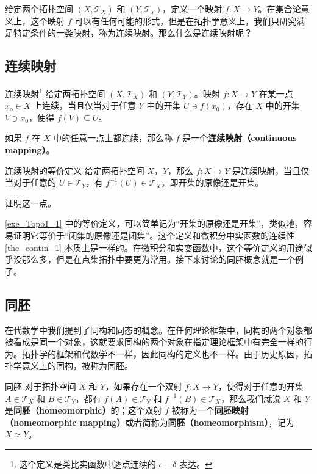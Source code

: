 

给定两个拓扑空间 $(X, \mathcal{T}_X)$ 和 $(Y, \mathcal{T}_Y)$，定义一个映射 $f:X\rightarrow Y$。在集合论意义上，这个映射 $f$ 可以有任何可能的形式，但是在拓扑学意义上，我们只研究满足特定条件的一类映射，称为连续映射。那么什么是连续映射呢？

\subsection{连续映射}
\begin{definition}{连续映射\footnote{这个定义是类比实函数中逐点连续的 $\epsilon-\delta$ 表达。}}
给定两拓扑空间 $(X, \mathcal{T}_X)$ 和 $(Y, \mathcal{T}_Y)$。映射 $f:X\rightarrow Y$ 在某一点 $x_o\in X$ 上连续，当且仅当对于任意 $Y$ 中的开集 $U\ni f(x_0)$，存在 $X$ 中的开集 $V\ni x_0$，使得 $f(V)\subseteq U$。

如果 $f$ 在 $X$ 中的任意一点上都连续，那么称 $f$ 是一个\textbf{连续映射（continuous mapping）}。
\end{definition}

\begin{exercise}{连续映射的等价定义}\label{exe_Topo1_1}
给定两拓扑空间 $X$，$Y$，那么 $f:X\rightarrow Y$ 是连续映射，当且仅当对于任意的 $U\in\mathcal{T}_Y$，有 $f^{-1}(U)\in\mathcal{T}_X$。即开集的原像还是开集。

证明这一点。
\end{exercise}

\autoref{exe_Topo1_1} 中的等价定义，可以简单记为“开集的原像还是开集”，类似地，容易证明它等价于“闭集的原像还是闭集”。这个定义和微积分中实函数的连续性\autoref{the_contin_1} 本质上是一样的。在微积分和实变函数中，这个等价定义的用途似乎没那么多，但是在点集拓扑中要更为常用。接下来讨论的同胚概念就是一个例子。

\subsection{同胚}

在代数学中我们提到了同构和同态的概念。在任何理论框架中，同构的两个对象都被看成是同一个对象，这就要求同构的两个对象在指定理论框架中有完全一样的行为。拓扑学的框架和代数学不一样，因此同构的定义也不一样。由于历史原因，拓扑学意义上的同构，被称为同胚。

\begin{definition}{同胚}
对于拓扑空间 $X$ 和 $Y$，如果存在一个双射 $f:X\rightarrow Y$，使得对于任意的开集 $A\in\mathcal{T}_X$ 和 $B\in\mathcal{T}_Y$，都有 $f(A)\in\mathcal{T}_Y$ 和 $f^{-1}(B)\in\mathcal{T}_X$，那么我们就说 $X$ 和 $Y$ 是\textbf{同胚（homeomorphic）}的；这个双射 $f$ 被称为一个\textbf{同胚映射（homeomorphic mapping）}或者简称为\textbf{同胚（homeomorphism）}，记为 $X\approx Y$。
\end{definition}

